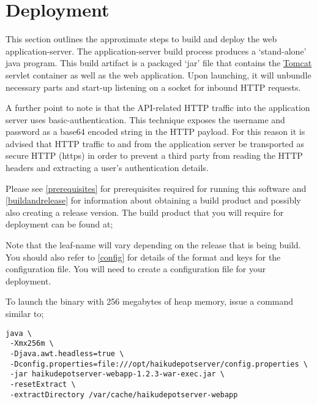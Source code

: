 \section{Deployment}

This section outlines the approximate steps to build and deploy the web application-server.  The application-server build process produces a  `stand-alone' java program.  This build artifact is a packaged `jar' file that contains the \href{http://tomcat.apache.org}{Tomcat} servlet container as well as the web application.  Upon launching, it will unbundle necessary parts and start-up listening on a socket for inbound HTTP requests.


A further point to note is that the API-related HTTP traffic into the application server uses basic-authentication.  This technique exposes the username and password as a base64 encoded string in the HTTP payload.  For this reason it is advised that HTTP traffic to and from the application server be transported as secure HTTP (https) in order to prevent a third party from reading the HTTP headers and extracting a user's authentication details.

Please see \ref{prerequisites} for prerequisites required for running this software and \ref{buildandrelease} for information about obtaining a build product and possibly also creating a release version.  The build product that you will require for deployment can be found at;


Note that the leaf-name will vary depending on the release that is being build.  You should also refer to \ref{config} for details of the format and keys for the configuration file.  You will need to create a configuration file for your deployment.

To launch the binary with 256 megabytes of heap memory, issue a command similar to;

\begin{verbatim}
java \
 -Xmx256m \
 -Djava.awt.headless=true \
 -Dconfig.properties=file:///opt/haikudepotserver/config.properties \
 -jar haikudepotserver-webapp-1.2.3-war-exec.jar \
 -resetExtract \
 -extractDirectory /var/cache/haikudepotserver-webapp
\end{verbatim}

